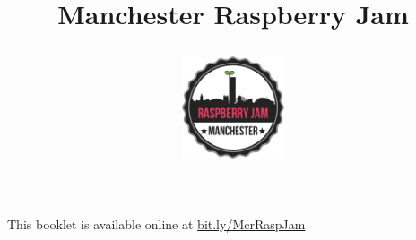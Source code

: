 \ifprint
	\title{Manchester Raspberry Jam \\ \workshopTitle}
\else
	\title{
		\begin{center}
			\includegraphics[width=30mm]{McrRaspJam/Common/logo-512}
		\end{center}
		\vspace{12pt}
		\workshopTitle
	}
\fi

	
\author{}
\date{}
\maketitle

\ifprint
	\begin{mdframed}[rightline=false, leftline=false]
		\scriptsize
		This booklet is available online at \mbox{\href{https://drive.google.com/open?id=0B_1SFjX_5JrmfnhpX0pPRXl6bmJNal8zdUxMeWZOdjJyZVdzU3V6UnBGdlVIMENtbFFkbVk}{bit.ly/McrRaspJam}}
		\normalsize
	\end{mdframed}
\fi